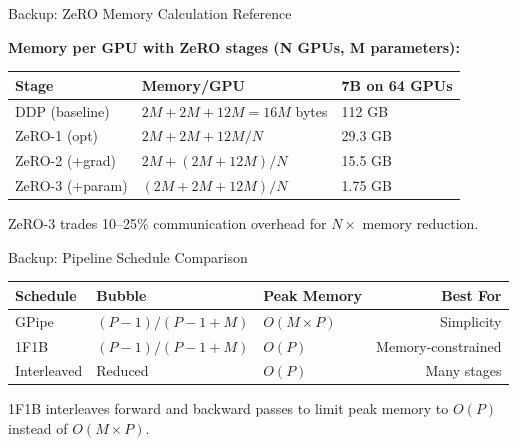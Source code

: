 \documentclass[aspectratio=169, 12pt]{beamer}
\begin{document}
\appendix

\begin{frame}{Backup: ZeRO Memory Calculation Reference}

\footnotesize
\textbf{Memory per GPU with ZeRO stages (N GPUs, M parameters):}

\vspace{0.15cm}
\renewcommand{\arraystretch}{1.2}
\begin{tabular}{@{}lll@{}}
  \toprule
  \textbf{Stage} & \textbf{Memory/GPU} & \textbf{7B on 64 GPUs} \\
  \midrule
  DDP (baseline) & $2M + 2M + 12M = 16M$ bytes & 112 GB \\
  ZeRO-1 (opt)   & $2M + 2M + 12M/N$ & 29.3 GB \\
  ZeRO-2 (+grad) & $2M + (2M + 12M)/N$ & 15.5 GB \\
  ZeRO-3 (+param)& $(2M + 2M + 12M)/N$ & 1.75 GB \\
  \bottomrule
\end{tabular}

\vspace{0.1cm}
{\footnotesize ZeRO-3 trades 10--25\% communication overhead for $N\times$ memory reduction.}

\end{frame}

\begin{frame}{Backup: Pipeline Schedule Comparison}

\footnotesize
\renewcommand{\arraystretch}{1.15}
\begin{tabular}{@{}lllr@{}}
  \toprule
  \textbf{Schedule} & \textbf{Bubble} & \textbf{Peak Memory} & \textbf{Best For} \\
  \midrule
  GPipe    & $(P-1)/(P-1+M)$ & $O(M \times P)$ & Simplicity \\
  1F1B     & $(P-1)/(P-1+M)$ & $O(P)$          & Memory-constrained \\
  Interleaved & Reduced         & $O(P)$          & Many stages \\
  \bottomrule
\end{tabular}

\vspace{0.15cm}
{\footnotesize 1F1B interleaves forward and backward passes to limit peak memory to $O(P)$ instead of $O(M \times P)$.}

\end{frame}
\end{document}
